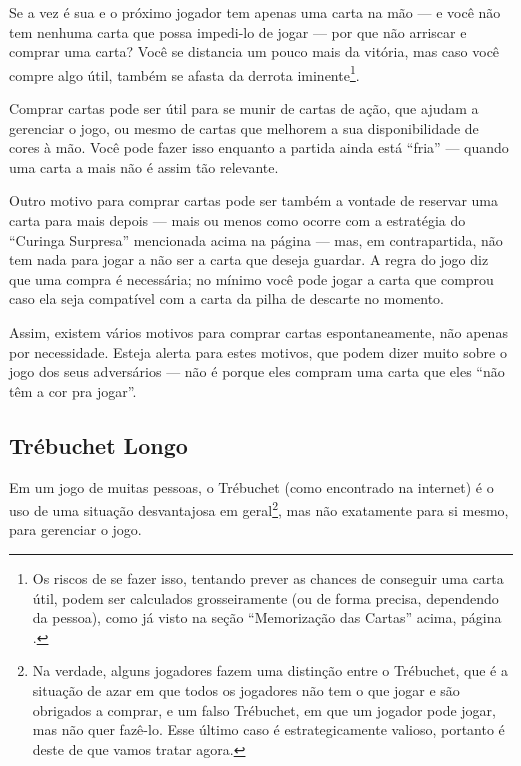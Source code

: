 Se a vez é sua e o próximo jogador tem apenas uma carta na mão --- e você não tem nenhuma carta que possa impedi-lo de jogar --- por que não arriscar e comprar uma carta? Você se distancia um pouco mais da vitória, mas caso você compre algo útil, também se afasta da derrota iminente\footnote{Os riscos de se fazer isso, tentando prever as chances de conseguir uma carta útil, podem ser calculados grosseiramente (ou de forma precisa, dependendo da pessoa), como já visto na seção ``Memorização das Cartas'' acima, página \pageref{memorizacaodascartas}.}.

Comprar cartas pode ser útil para se munir de cartas de ação, que ajudam a gerenciar o jogo, ou mesmo de cartas que melhorem a sua disponibilidade de cores à mão. Você pode fazer isso enquanto a partida ainda está ``fria'' --- quando uma carta a mais não é assim tão relevante.

Outro motivo para comprar cartas pode ser também a vontade de reservar uma carta para mais depois --- mais ou menos como ocorre com a estratégia do ``Curinga Surpresa'' mencionada acima na página \pageref{curingasurpresa} --- mas, em contrapartida, não tem nada para jogar a não ser a carta que deseja guardar. A regra do jogo diz que uma compra é necessária; no mínimo você pode jogar a carta que comprou caso ela seja compatível com a carta da pilha de descarte no momento.

Assim, existem vários motivos para comprar cartas espontaneamente, não apenas por necessidade. Esteja alerta para estes motivos, que podem dizer muito sobre o jogo dos seus adversários --- não é porque eles compram uma carta que eles ``não têm a cor pra jogar''.

\subsection{Trébuchet Longo}

\label{trebuchetlongo}

Em um jogo de muitas pessoas, o Trébuchet (como encontrado na internet) é o uso de uma situação desvantajosa em geral\footnote{Na verdade, alguns jogadores fazem uma distinção entre o Trébuchet, que é a situação de azar em que todos os jogadores não tem o que jogar e são obrigados a comprar, e um falso Trébuchet, em que um jogador pode jogar, mas não quer fazê-lo. Esse último caso é estrategicamente valioso, portanto é deste de que vamos tratar agora.}, mas não exatamente para si mesmo, para gerenciar o jogo.

